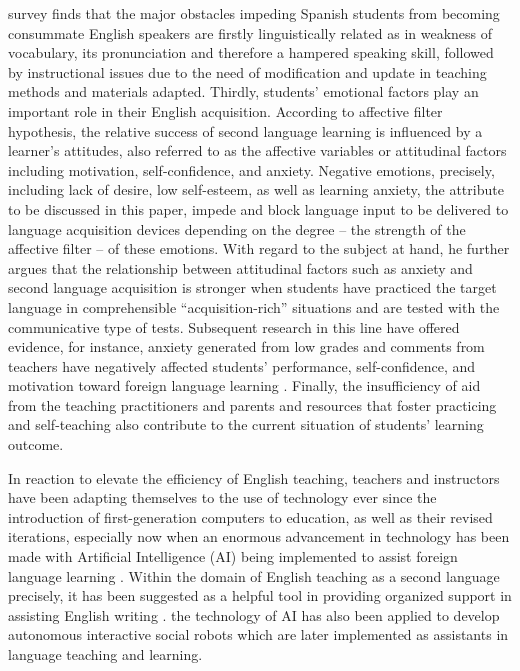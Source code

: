 \documentclass[english]{textolivre}
\begin{document}
 survey finds that the major obstacles impeding Spanish students from becoming consummate English speakers are firstly linguistically related as in weakness of vocabulary, its pronunciation and therefore a hampered speaking skill, followed by instructional issues due to the need of modification and update in teaching methods and materials adapted. Thirdly, students’ emotional factors play an important role in their English acquisition. According to  affective filter hypothesis, the relative success of second language learning is influenced by a learner's attitudes, also referred to as the affective variables or attitudinal factors including motivation, self-confidence, and anxiety. Negative emotions, precisely, including lack of desire, low self-esteem, as well as learning anxiety, the attribute to be discussed in this paper, impede and block language input to be delivered to language acquisition devices depending on the degree – the strength of the affective filter – of these emotions. With regard to the subject at hand, he further argues that the relationship between attitudinal factors such as anxiety and second language acquisition is stronger when students have practiced the target language in comprehensible “acquisition-rich” situations and are tested with the communicative type of tests. Subsequent research in this line have offered evidence, for instance, anxiety generated from low grades and comments from teachers have negatively affected students’ performance, self-confidence, and motivation toward foreign language learning \cite{chen_relationship_2004, dewaele_does_2018}. Finally, the insufficiency of aid from the teaching practitioners and parents and resources that foster practicing and self-teaching also contribute to the current situation of students’ learning outcome.

In reaction to elevate the efficiency of English teaching, teachers and instructors have been adapting themselves to the use of technology ever since the introduction of first-generation computers to education, as well as their revised iterations, especially now when an enormous advancement in technology has been made with Artificial Intelligence (AI) being implemented to assist foreign language learning \cite{tahiru_ai_2021}. Within the domain of English teaching as a second language precisely, it has been suggested as a helpful tool in providing organized support in assisting English writing \cite{gayed_exploring_2022}. the technology of AI has also been applied to develop autonomous interactive social robots which are later implemented as assistants in language teaching and learning. 
\end{document}

